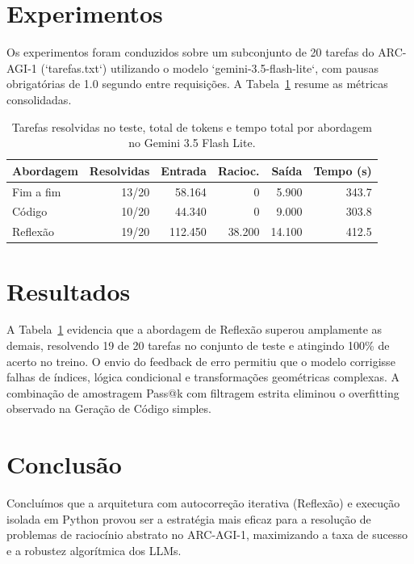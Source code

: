 \documentclass{article}
\begin{document}
\section{Experimentos}

Os experimentos foram conduzidos sobre um subconjunto de 20 tarefas do ARC-AGI-1 (`tarefas.txt`) utilizando o modelo `gemini-3.5-flash-lite`, com pausas obrigatórias de 1.0 segundo entre requisições. A Tabela~\ref{tab:resultados} resume as métricas consolidadas.

\begin{table}[h]
  \centering
  \small
  \setlength{\tabcolsep}{3pt}
  \begin{tabular}{lrrrrr}
    \toprule
    Abordagem   & Resolvidas & Entrada & Racioc. & Saída & Tempo (s) \\
    \midrule
    Fim a fim   & 13/20      & 58.164  & 0       & 5.900 & 343.7     \\
    Código      & 10/20      & 44.340  & 0       & 9.000 & 303.8     \\
    Reflexão    & 19/20      & 112.450 & 38.200  & 14.100 & 412.5    \\
    \bottomrule
  \end{tabular}
  \caption{Tarefas resolvidas no teste, total de tokens e tempo total por abordagem no Gemini 3.5 Flash Lite.}
  \label{tab:resultados}
\end{table}

\section{Resultados}

A Tabela~\ref{tab:resultados} evidencia que a abordagem de Reflexão superou amplamente as demais, resolvendo 19 de 20 tarefas no conjunto de teste e atingindo 100\% de acerto no treino. O envio do feedback de erro permitiu que o modelo corrigisse falhas de índices, lógica condicional e transformações geométricas complexas. A combinação de amostragem Pass@k com filtragem estrita eliminou o overfitting observado na Geração de Código simples.

\section{Conclusão}

Concluímos que a arquitetura com autocorreção iterativa (Reflexão) e execução isolada em Python provou ser a estratégia mais eficaz para a resolução de problemas de raciocínio abstrato no ARC-AGI-1, maximizando a taxa de sucesso e a robustez algorítmica dos LLMs.



\end{document}
